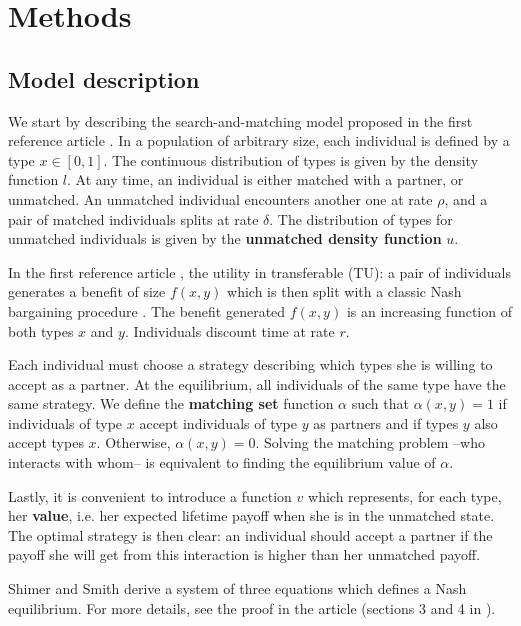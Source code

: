 \section*{Methods}

\subsection*{Model description}

We start by describing the search-and-matching model proposed in the first reference article \citep{shimer_assortative_2000}. In a population of arbitrary size, each individual is defined by a type $x \in [0,1]$. The continuous distribution of types is given by the density function $l$. At any time, an individual is either matched with a partner, or unmatched. An unmatched individual encounters another one at rate $\rho$, and a pair of matched individuals splits at rate $\delta$. The distribution of types for unmatched individuals is given by the \textbf{unmatched density function} $u$.

In the first reference article \citep{shimer_assortative_2000}, the utility in transferable (TU): a pair of individuals generates a benefit of size $f(x,y)$ which is then split with a classic Nash bargaining procedure \citep{osborne_bargaining_1990,shimer_assortative_2000}. The benefit generated $f(x,y)$ is an increasing function of both types $x$ and $y$. Individuals discount time at rate $r$.

Each individual must choose a strategy describing which types she is willing to accept as a partner. At the equilibrium, all individuals of the same type have the same strategy. We define the \textbf{matching set} function $\alpha$ such that $\alpha(x,y) = 1$ if individuals of type $x$ accept individuals of type $y$ as partners and if types $y$ also accept types $x$. Otherwise, $\alpha(x,y) = 0$. Solving the matching problem --who interacts with whom-- is equivalent to finding the equilibrium value of $\alpha$.

Lastly, it is convenient to introduce a function $v$ which represents, for each type, her \textbf{value}, i.e. her expected lifetime payoff when she is in the unmatched state. The optimal strategy is then clear: an individual should accept a partner if the payoff she will get from this interaction is higher than her unmatched payoff.

Shimer and Smith derive a system of three equations which defines a Nash equilibrium. For more details, see the proof in the article (sections 3 and 4 in \citep{shimer_assortative_2000}).

